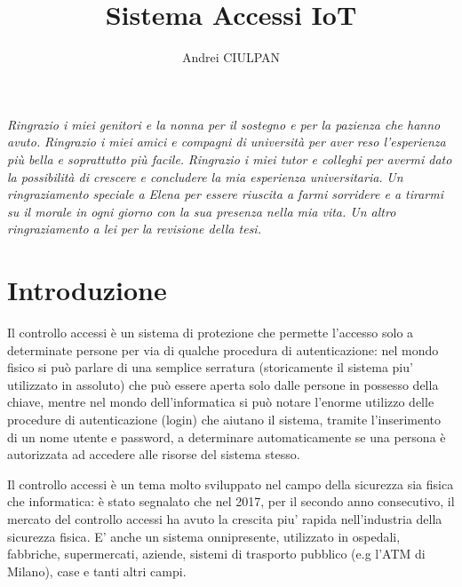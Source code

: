 \documentclass[12pt]{report}
\newcommand\blankpage{%
	\null
	\thispagestyle{empty}%
	\addtocounter{page}{-1}%
	\newpage}
\begin{document}
\title{Sistema Accessi IoT}
\author{Andrei CIULPAN}
\afterpage{\blankpage}
% 
%
\beforepreface

{\hfill \footnotesize {\sl Ringrazio i miei genitori e la nonna per il sostegno e per la pazienza che hanno avuto.}}
\vskip 0.8cm
{\hfill \footnotesize {\sl Ringrazio i miei amici e compagni di università per aver reso l'esperienza più bella e soprattutto più facile.}}
\vskip 0.8cm
{\hfill \footnotesize {\sl Ringrazio i miei tutor e colleghi per avermi dato la possibilità di crescere e concludere la mia esperienza universitaria.}}
\vskip 0.8cm
{\hfill \footnotesize {\sl Un ringraziamento speciale a Elena per essere riuscita a farmi sorridere e a tirarmi su il morale in ogni giorno con la sua presenza nella mia vita.  Un altro ringraziamento a lei per la revisione della tesi.}}
       

\afterpreface


\chapter{Introduzione}\label{cap:introduzione}
%

Il controllo accessi è un sistema di protezione che permette l'accesso solo a determinate persone per via di qualche procedura di autenticazione: nel mondo fisico si può parlare di una semplice serratura (storicamente il sistema piu' utilizzato in assoluto) che può essere aperta solo dalle persone in possesso della chiave, mentre nel mondo dell'informatica si può notare l'enorme utilizzo delle procedure di autenticazione (login) che aiutano il sistema, tramite l'inserimento di un nome utente e password, a determinare automaticamente se una persona è autorizzata ad accedere alle risorse del sistema stesso.

Il controllo accessi\cite{controllo_accessi} è un tema molto sviluppato nel campo della sicurezza sia fisica che informatica: è stato segnalato che nel 2017, per il secondo anno consecutivo, il mercato del controllo accessi ha avuto la crescita piu' rapida nell'industria della sicurezza fisica\cite{crescita_controllo_accessi}. E' anche un sistema onnipresente, utilizzato in ospedali, fabbriche, supermercati, aziende, sistemi di trasporto pubblico (e.g l'ATM di Milano), case e tanti altri campi.  
\end{document}
